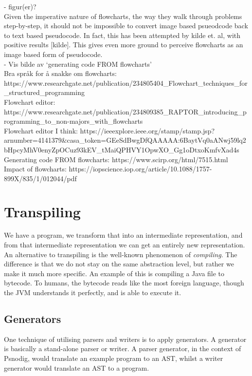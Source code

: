 - figur(er)? \\

Given the imperative nature of flowcharts, the way they walk through problems step-by-step, it should not be impossible to convert image based psueodcode back to text based pseudocode. In fact, this has been attempted by kilde et. al, with positive results [kilde]. This gives even more ground to perceive flowcharts as an image based form of pseudocode. \hfill \\

- Vis bilde av ‘generating code FROM flowcharts' \\

Bra språk for å snakke om flowcharts: https://www.researchgate.net/publication/234805404\_Flowchart\_techniques\_for\_structured\_programming \\

Flowchart editor: https://www.researchgate.net/publication/234809385\_RAPTOR\_introducing\_programming\_to\_non-majors\_with\_flowcharts \\

Flowchart editor I think: https://ieeexplore.ieee.org/stamp/stamp.jsp?arnumber=4141379\&casa\_token=GEeSdBwgDfQAAAAA:6BaytVq0aANwj59lq2bHpcyMhV0enyZpOCuz93kEV\_tMaiQPHVY1OpwXO\_Gg1oDtxoKmfvXad4s \\

Generating code FROM flowcharts: https://www.scirp.org/html/7515.html \\

Impact of flowcharts: https://iopscience.iop.org/article/10.1088/1757-899X/835/1/012044/pdf

\section{Transpiling}
We have a program, we transform that into an intermediate representation, and from that intermediate representation we can get an entirely new representation. \hfill \\

An alternative to transpiling is the well-known phenomenon of \textit{compiling}. The difference is that we do not stay on the same abstraction level, but rather we make it much more specific. An example of this is compiling a Java file to bytecode. To humans, the bytecode reads like the most foreign language, though the JVM understands it perfectly, and is able to execute it. \hfill \\

\subsection{Generators}
One technique of utilising parsers and writers is to apply generators. A generator is basically a stand-alone parser or writer. A parser generator, in the context of Psnodig, would translate an example program to an AST, whilst a writer generator would translate an AST to a program. \hfill \\

